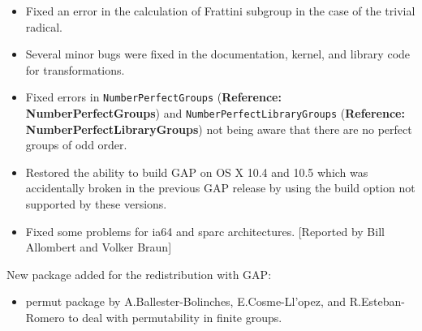\documentclass[a4paper,11pt]{report}
\begin{document}
{{\begin{itemize}
homomorphic images, providing fallback to a default algorithm. 
\item  Fixed an error in the calculation of Frattini subgroup in the case of the
trivial radical. 
\item  Several minor bugs were fixed in the documentation, kernel, and library code
for transformations. 
\item  Fixed errors in \texttt{NumberPerfectGroups} (\textbf{Reference: NumberPerfectGroups}) and \texttt{NumberPerfectLibraryGroups} (\textbf{Reference: NumberPerfectLibraryGroups}) not being aware that there are no perfect groups of odd order. 
\item  Restored the ability to build \textsf{GAP} on OS X 10.4 and 10.5 which was accidentally broken in the previous \textsf{GAP} release by using the build option not supported by these versions. 
\item  Fixed some problems for ia64 and sparc architectures. [Reported by Bill
Allombert and Volker Braun] 
\end{itemize}
 New package added for the redistribution with \textsf{GAP}: 
\begin{itemize}
\item  \textsf{permut} package by A.Ballester-Bolinches, E.Cosme-Ll{\a'o}pez, and R.Esteban-Romero to
deal with permutability in finite groups. 
\end{itemize}
 }

 }

    
\end{document}
